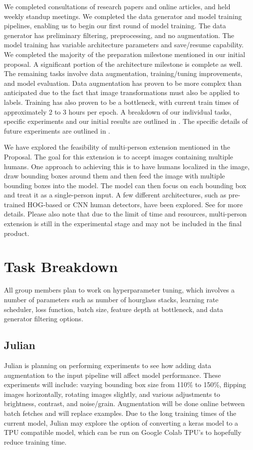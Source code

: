\documentclass[11pt, letterpaper]{article}
\begin{document}
We completed consultations of research papers and online articles, and held weekly standup meetings. We completed the data generator and model training pipelines, enabling us to begin our first round of model training. The data generator has preliminary filtering, preprocessing, and no augmentation. The model training has variable architecture parameters and save/resume capability. We completed the majority of the preparation milestone mentioned in our initial proposal. A significant portion of the architecture milestone is complete as well. The remaining tasks involve data augmentation, training/tuning improvements, and model evaluation. Data augmentation has proven to be more complex than anticipated due to the fact that image transformations must also be applied to labels. Training has also proven to be a bottleneck, with current train times of approximately 2 to 3 hours per epoch. A breakdown of our individual tasks, specific experiments and our initial results are outlined in . The specific details of future experiments are outlined in . 

We have explored the feasibility of multi-person extension mentioned in the Proposal. The goal for this extension is to accept images containing multiple humans. One approach to achieving this is to have humans localized in the image, draw bounding boxes around them and then feed the image with multiple bounding boxes into the model. The model can then focus on each bounding box and treat it as a single-person input. A few different architectures, such as pre-trained HOG-based or CNN human detectors, have been explored. See  for more details. Please also note that due to the limit of time and resources, multi-person extension is still in the experimental stage and may not be included in the final product.


\section{Task Breakdown}
\label{SectionTaskB}

All group members plan to work on hyperparameter tuning, which involves a number of parameters such as number of hourglass stacks, learning rate scheduler, loss function, batch size, feature depth at bottleneck, and data generator filtering options.

\subsection{Julian}
Julian is planning on performing experiments to see how adding data augmentation to the input pipeline will affect model performance. These experiments will include: varying bounding box size from 110\% to 150\%, flipping images horizontally, rotating images slightly, and various adjustments to brightness, contrast, and noise/grain. Augmentation will be done online between batch fetches and will replace examples. Due to the long training times of the current model, Julian may explore the option of converting a keras model to a TPU compatible model, which can be run on Google Colab TPU’s to hopefully reduce training time.
\end{document}
